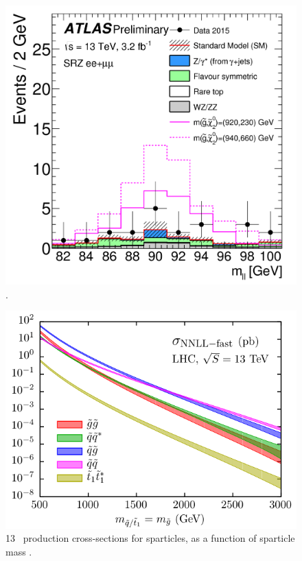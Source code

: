 \begin{centering}
\begin{figure}[!hbt]
\myfloatalign
\includegraphics[width=.9\linewidth]{figures/theory/fig_05.png}
\caption{ \cite{ATLAS-CONF-2015-082}.}
\label{fig:atlas_eoye}
\end{figure}
\end{centering}

\begin{centering}
\begin{figure}[!hbt]
\myfloatalign
\includegraphics[width=.9\linewidth]{figures/theory/nnllfast_wpresc_total.pdf}
\caption{ 13 \tev~production cross-sections for sparticles, as a function of sparticle mass \cite{1607.07741}.}
\label{fig:gluino_xs}
\end{figure}
\end{centering}


